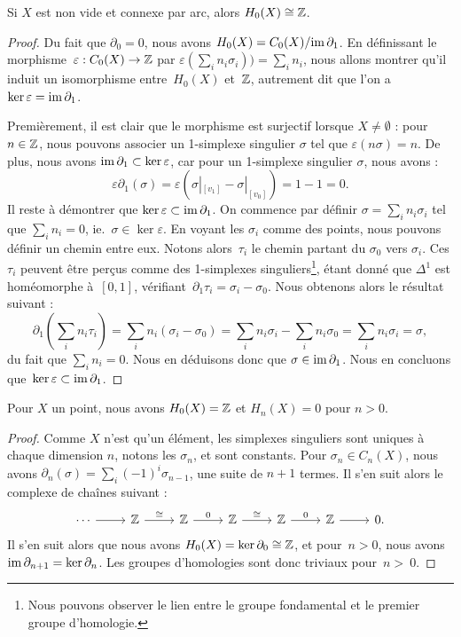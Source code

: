 \begin{proposition}
Si $X$ est non vide et connexe par arc, alors $H_0(X)\cong\mathbb{Z}$.
\end{proposition}
\begin{proof}
Du fait que $\partial_0=0$, nous avons $H_0(X)=C_0(X)/\mathrm{im}\,\partial_1$. En définissant le morphisme~${\varepsilon:C_0(X)\to \mathbb{Z}}$ par $\varepsilon(\sum_in_i\sigma_i))=\sum_in_i$, nous allons montrer qu'il induit un isomorphisme entre~$H_0(X)$ et~$\mathbb{Z}$, autrement dit que l'on a $\ker\varepsilon=\mathrm{im}\,\partial_1$.

Premièrement, il est clair que le morphisme est surjectif lorsque $X\neq\emptyset$ : pour $n\in \mathbb{Z}$, nous pouvons associer un 1-simplexe singulier $\sigma$ tel que $\varepsilon(n\sigma)=n$. De plus, nous avons $\mathrm{im}\,\partial_1\subset\ker\varepsilon$, car pour un 1-simplexe singulier $\sigma$, nous avons : $$\varepsilon\partial_1(\sigma)=\varepsilon(\sigma|_{[v_1]}-\sigma|_{[v_0]})=1-1=0.$$
Il reste à démontrer que $\ker\varepsilon\subset\mathrm{im}\,\partial_1$. On commence par définir $\sigma=\sum_in_i\sigma_i$ tel que $\sum_in_i=0$, ie.~$\sigma\in\ker\varepsilon$. En voyant les $\sigma_i$ comme des points, nous pouvons définir un chemin entre eux. Notons alors~$\tau_i$ le chemin partant du $\sigma_0$ vers $\sigma_i$. Ces $\tau_i$ peuvent être perçus comme des 1-simplexes singuliers\footnote{Nous pouvons observer le lien entre le groupe fondamental et le premier groupe d'homologie.}, étant donné que $\Delta^1$ est homéomorphe à~$[0,1]$, vérifiant~$\partial_1\tau_i=\sigma_i-\sigma_0$. Nous obtenons alors le résultat suivant : \[\partial_1\left(\sum_in_i\tau_i\right)=\sum_in_i(\sigma_i-\sigma_0)=\sum_in_i\sigma_i-\sum_in_i\sigma_0=\sum_in_i\sigma_i=\sigma,\]du fait que $\sum_in_i=0$. Nous en déduisons donc que $\sigma\in\mathrm{im}\,\partial_1$. Nous en concluons que~${\ker\varepsilon\subset\mathrm{im}\,\partial_1}$.
\end{proof}

\begin{proposition}
Pour $X$ un point, nous avons $H_0(X)=\mathbb{Z}$ et $H_n(X)=0$ pour $n>0$.
\end{proposition}
\begin{proof}
Comme $X$ n'est qu'un élément, les simplexes singuliers sont uniques à chaque dimension $n$, notons les $\sigma_n$, et sont constants. Pour $\sigma_n\in C_n(X)$, nous avons $\partial_n(\sigma)=\sum_i(-1)^i\sigma_{n-1}$, une suite de $n+1$ termes. Il s'en suit alors le complexe de chaînes suivant : 
\[\begin{tikzcd}
\centering
\cdots\arrow[r]&\bb{Z}\arrow[r,"\cong"]&\bb{Z}\arrow[r,"0"]&\bb{Z}\arrow[r,"\cong"]&\bb{Z}\arrow[r,"0"]&\bb{Z}\arrow[r]&0.
\end{tikzcd}\]
Il s'en suit alors que nous avons $H_0(X)=\ker\partial_0\cong\mathbb{Z}$, et pour~$n>0$, nous avons~$\mathrm{im}\,\partial_{n+1}=\ker\partial_n$. Les groupes d'homologies sont donc triviaux pour~$n>~0$.
\end{proof}

